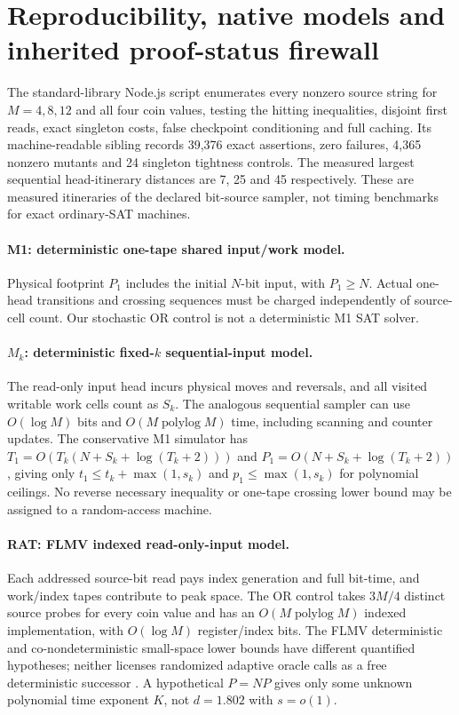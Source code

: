 \documentclass[11pt]{article}
\begin{document}
\section{Reproducibility, native models and inherited proof-status firewall}
The standard-library Node.js script
enumerates every nonzero source string for $M=4,8,12$ and all four
coin values, testing the hitting inequalities, disjoint first reads,
exact singleton costs, false checkpoint conditioning and full caching.
Its machine-readable sibling
records 39,376 exact assertions, zero failures, 4,365 nonzero
mutants and 24 singleton tightness controls. The measured largest
sequential head-itinerary distances are 7, 25 and 45 respectively.
These are measured itineraries of the declared bit-source sampler,
not timing benchmarks for exact ordinary-SAT machines.

\paragraph{M1: deterministic one-tape shared input/work model.}
Physical footprint $P_1$ includes the initial $N$-bit input,
with $P_1\ge N$. Actual one-head transitions and crossing
sequences must be charged independently of source-cell count.
Our stochastic OR control is not a deterministic M1 SAT solver.

\paragraph{$M_k$: deterministic fixed-$k$ sequential-input model.}
The read-only input head incurs physical moves and reversals,
and all visited writable work cells count as $S_k$.
The analogous sequential sampler can use $O(\log M)$ bits and
$O(M\operatorname{polylog}M)$ time, including scanning and
counter updates. The conservative M1 simulator has
$T_1=O(T_k(N+S_k+\log(T_k+2)))$ and
$P_1=O(N+S_k+\log(T_k+2))$, giving only
$t_1\le t_k+\max(1,s_k)$ and
$p_1\le\max(1,s_k)$ for polynomial ceilings.
No reverse necessary inequality or one-tape crossing lower bound
may be assigned to a random-access machine.

\paragraph{RAT: FLMV indexed read-only-input model.}
Each addressed source-bit read pays index generation and full
bit-time, and work/index tapes contribute to peak space.
The OR control takes $3M/4$ distinct source probes for every coin
value and has an $O(M\operatorname{polylog}M)$ indexed
implementation, with $O(\log M)$ register/index bits. The
FLMV deterministic and co-nondeterministic small-space lower
bounds have different quantified hypotheses; neither licenses
randomized adaptive oracle calls as a free deterministic successor
\cite{flmv}. A hypothetical $P=NP$ gives only some unknown polynomial
time exponent $K$, not $d=1.802$ with $s=o(1)$.
\end{document}
